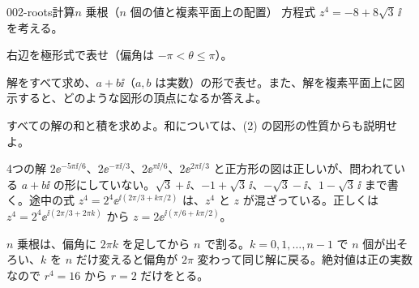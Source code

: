 \documentclass[uplatex,dvipdfmx,a4paper,11pt]{jsarticle}
\begin{document}
\begin{mondai}{002-roots}{計算}{$n$ 乗根（$n$ 個の値と複素平面上の配置）}
方程式 $z^{4}=-8+8\sqrt{3}\,\ii$ を考える。
  \begin{shoumon}
    \item 右辺を極形式で表せ（偏角は $-\pi<\theta\le\pi$）。
    \item 解をすべて求め、$a+b\ii$（$a,b$ は実数）の形で表せ。また、解を複素平面上に図示すると、どのような図形の頂点になるか答えよ。
    \item すべての解の和と積を求めよ。和については、(2) の図形の性質からも説明せよ。
  \end{shoumon}

\begin{kotaeran}
   4つの解 $2\ee^{-5\pi\ii/6}$、$2\ee^{-\pi\ii/3}$、$2\ee^{\pi\ii/6}$、$2\ee^{2\pi\ii/3}$ と正方形の図は正しいが、問われている $a+b\ii$ の形にしていない。$\sqrt{3}+\ii$、$-1+\sqrt{3}\,\ii$、$-\sqrt{3}-\ii$、$1-\sqrt{3}\,\ii$ まで書く。途中の式 $z^{4}=2^{4}\ee^{\ii(2\pi/3+k\pi/2)}$ は、$z^{4}$ と $z$ が混ざっている。正しくは $z^{4}=2^{4}\ee^{\ii(2\pi/3+2\pi k)}$ から $z=2\ee^{\ii(\pi/6+k\pi/2)}$。
\end{kotaeran}
\begin{rikai}
  \item $n$ 乗根は、偏角に $2\pi k$ を足してから $n$ で割る。$k=0,1,\ldots,n-1$ で $n$ 個が出そろい、$k$ を $n$ だけ変えると偏角が $2\pi$ 変わって同じ解に戻る。絶対値は正の実数なので $r^{4}=16$ から $r=2$ だけをとる。
\end{rikai}
\end{mondai}
\end{document}

